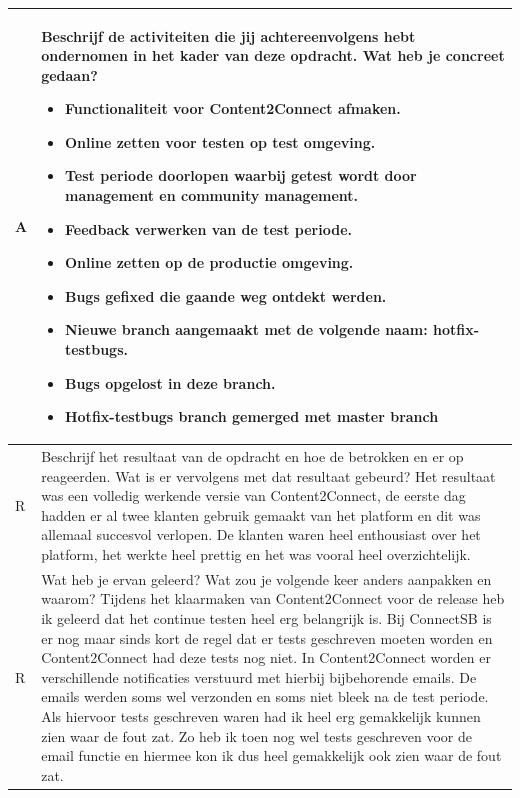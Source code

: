 \begin{tabularx}{\textwidth}{| l | X |}
\\
\hline
A & Beschrijf de activiteiten die jij achtereenvolgens hebt ondernomen in het kader van deze opdracht. Wat heb je concreet gedaan?
\begin{itemize}
\item Functionaliteit voor Content2Connect afmaken.
\item Online zetten voor testen op test omgeving.
\item Test periode doorlopen waarbij getest wordt door management en community management.
\item Feedback verwerken van de test periode.
\item Online zetten op de productie omgeving.
\item Bugs gefixed die gaande weg ontdekt werden.
\item Nieuwe branch aangemaakt met de volgende naam: hotfix-testbugs.
\item Bugs opgelost in deze branch.
\item Hotfix-testbugs branch gemerged met master branch
\end{itemize}
\\
\hline
R & Beschrijf het resultaat van de opdracht en hoe de betrokken en er op reageerden. Wat is er vervolgens met dat resultaat gebeurd?
\newline
\newline
Het resultaat was een volledig werkende versie van  Content2Connect, de eerste dag hadden er al twee klanten gebruik gemaakt van het platform en dit was allemaal succesvol verlopen. De klanten waren heel enthousiast over het platform, het werkte heel prettig en het was vooral heel overzichtelijk.
\\
\hline
R & Wat heb je ervan geleerd? Wat zou je volgende keer anders aanpakken en waarom?
\newline
\newline
Tijdens het klaarmaken van Content2Connect voor de release heb ik geleerd dat het continue testen heel erg belangrijk is. Bij ConnectSB is er nog maar sinds kort de regel dat er tests geschreven moeten worden en Content2Connect had deze tests nog niet. In Content2Connect worden er verschillende notificaties verstuurd met hierbij bijbehorende emails. De emails werden soms wel verzonden en soms niet bleek na de test periode. Als hiervoor tests geschreven waren had ik heel erg gemakkelijk kunnen zien waar de fout zat. Zo heb ik toen nog wel tests geschreven voor de email functie en hiermee kon ik dus heel gemakkelijk ook zien waar de fout zat.


\end{tabularx}
